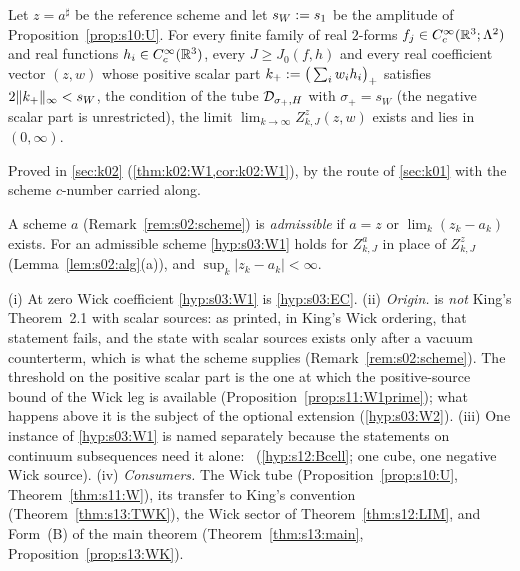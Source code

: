 \begin{theorem}\label{hyp:s03:W1}
Let $z=a^\sharp$ be the reference scheme and let $s_W:= s_1$ be the amplitude of Proposition~\ref{prop:s10:U}. For every finite family of real $2$-forms $f_j\in C^\infty_c(\mathbb R^3;\Lambda^2)$ and real functions $h_i\in C^\infty_c(\mathbb R^3)$, every $J\ge J_0(f,h)$ and every real coefficient vector $(z,w)$ whose positive scalar part $k_+:=\big(\sum_iw_ih_i\big)_+$ satisfies $2\lVert k_+\rVert_\infty<s_W$, the condition of the tube $\mathcal D_{\sigma_+,H}$ with $\sigma_+=s_W$ (the negative scalar part is unrestricted), the limit $\lim_{k\to\infty}Z^{z}_{k,J}(z,w)$ exists and lies in $(0,\infty)$.
\end{theorem}
Proved in \cref{sec:k02} (\cref{thm:k02:W1,cor:k02:W1}), by the route of \cref{sec:k01} with the scheme $c$-number carried along.

\begin{definition}\label{def:s03:adm}
A scheme $a$ (Remark~\ref{rem:s02:scheme}) is \emph{admissible} if $a=z$ or $\lim_k(z_k-a_k)$ exists. For an admissible scheme \cref{hyp:s03:W1} holds for $Z^a_{k,J}$ in place of $Z^z_{k,J}$ (Lemma~\ref{lem:s02:alg}(a)), and $\sup_k|z_k-a_k|<\infty$.
\end{definition}

\begin{remark}\label{rem:s03:W1}
(i) At zero Wick coefficient \cref{hyp:s03:W1} is \cref{hyp:s03:EC}.
(ii) \emph{Origin.}  is \emph{not} King's Theorem~2.1 with scalar sources: as printed, in King's Wick ordering, that statement fails, and the state with scalar sources exists only after a vacuum counterterm, which is what the scheme supplies (Remark~\ref{rem:s02:scheme}). The threshold on the positive scalar part is the one at which the positive-source bound of the Wick leg is available (Proposition~\ref{prop:s11:W1prime}); what happens above it is the subject of the optional extension (\cref{hyp:s03:W2}).
(iii) One instance of \cref{hyp:s03:W1} is named separately because the statements on continuum subsequences need it alone: \Bcell\ (\cref{hyp:s12:Bcell}; one cube, one negative Wick source).
(iv) \emph{Consumers.} The Wick tube (Proposition~\ref{prop:s10:U}, Theorem~\ref{thm:s11:W}), its transfer to King's convention (Theorem~\ref{thm:s13:TWK}), the Wick sector of Theorem~\ref{thm:s12:LIM}, and Form~(B) of the main theorem (Theorem~\ref{thm:s13:main}, Proposition~\ref{prop:s13:WK}).
\end{remark}

